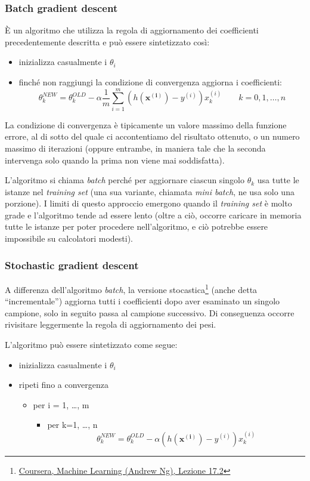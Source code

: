 \subsubsection{Batch gradient descent}
È un algoritmo che utilizza la regola di aggiornamento dei coefficienti precedentemente descritta e può essere sintetizzato così:
\begin{itemize}
  \item inizializza casualmente i $\theta_i$
  \item finché non raggiungi la condizione di convergenza aggiorna i coefficienti:
  \begin{equation*}
    \theta_k^{NEW} = \theta_k^{OLD} - \alpha \frac{1}{m} \sum_{i=1}^m (h(\mathbf{x^{(i)}})-y^{(i)}) x^{(i)}_k \qquad k = 0, 1, \dots, n
    \end{equation*}
  
\end{itemize}
La condizione di convergenza è tipicamente un valore massimo della funzione errore, al di sotto del quale ci accontentiamo del risultato ottenuto, o un numero massimo di iterazioni (oppure entrambe, in maniera tale che la seconda intervenga solo quando la prima non viene mai soddisfatta).

L'algoritmo si chiama \emph{batch} perché per aggiornare ciascun singolo $\theta_k$ usa tutte le istanze nel \emph{training set} (una sua variante, chiamata \emph{mini batch}, ne usa solo una porzione). I limiti di questo approccio emergono quando il \emph{training set} è molto grade e l'algoritmo tende ad essere lento (oltre a ciò, occorre caricare in memoria tutte le istanze per poter procedere nell'algoritmo, e ciò potrebbe essere impossibile su calcolatori modesti).

\subsubsection{Stochastic gradient descent}
A differenza dell'algoritmo \emph{batch}, la versione stocastica\footnote{\href{http://youtu.be/gdZxqnTKndE}{Coursera, Machine Learning (Andrew Ng), Lezione 17.2}} (anche detta ``incrementale'') aggiorna tutti i coefficienti dopo aver esaminato un singolo campione, solo in seguito passa al campione successivo. Di conseguenza occorre rivisitare leggermente la regola di aggiornamento dei pesi. 

L'algoritmo  può essere sintetizzato come segue:
\begin{itemize}
  \item inizializza casualmente i $\theta_i$
  \item ripeti fino a convergenza
  \begin{itemize}
    \item per i = 1, \dots, m
    \begin{itemize}
    \item per k=1, \dots, n
    \begin{equation*}
    \theta_k^{NEW} = \theta_k^{OLD} - \alpha (h(\mathbf{x^{(i)}})-y^{(i)}) x^{(i)}_k
    \end{equation*}
    \end{itemize}
  \end{itemize}
\end{itemize}

